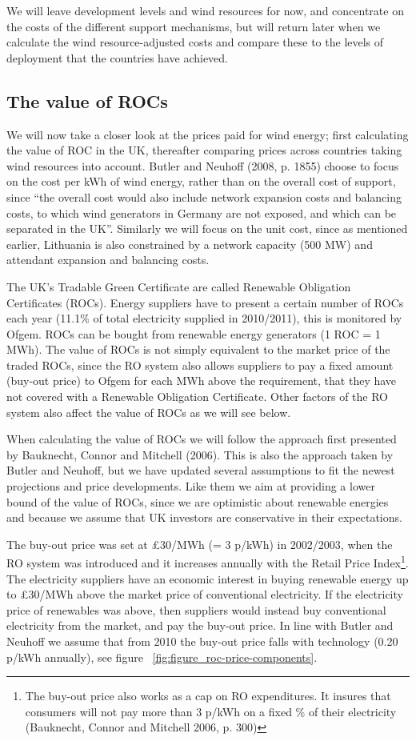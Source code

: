 \documentclass[a4paper, 12pt]{article}
\begin{document}
We will leave development levels and wind resources for now, and concentrate on the costs of the different support mechanisms, but will return later when we calculate the wind resource-adjusted costs and compare these to the levels of deployment that the countries have achieved.

\subsection{The value of ROCs}

We will now take a closer look at the prices paid for wind energy; first calculating the value of ROC in the UK, thereafter comparing prices across countries taking wind resources into account. Butler and Neuhoff (2008, p. 1855) choose to focus on the cost per kWh of wind energy, rather than on the overall cost of support, since ``the overall cost would also include network expansion costs and balancing costs, to which wind generators in Germany are not exposed, and which can be separated in the UK''. Similarly we will focus on the unit cost, since as mentioned earlier, Lithuania is also constrained by a network capacity (500 MW) and attendant expansion and balancing costs.

The UK's Tradable Green Certificate are called Renewable Obligation Certificates (ROCs). Energy suppliers have to present a certain number of ROCs each year (11.1\% of total electricity supplied in 2010/2011), this is monitored by Ofgem. ROCs can be bought from renewable energy generators (1 ROC = 1 MWh). The value of ROCs is not simply equivalent to the market price of the traded ROCs, since the RO system also allows suppliers to pay a fixed amount (buy-out price) to Ofgem for each MWh above the requirement, that they have not covered with a Renewable Obligation Certificate. Other factors of the RO system also affect the value of ROCs as we will see below.

When calculating the value of ROCs we will follow the approach first presented by Bauknecht, Connor and Mitchell (2006). This is also the approach taken by Butler and Neuhoff, but we have updated several assumptions to fit the newest projections and price developments. Like them we aim at providing a lower bound of the value of ROCs, since we are optimistic about renewable energies and because we assume that UK investors are conservative in their expectations.

The buy-out price was set at £30/MWh (= 3 p/kWh) in 2002/2003, when the RO system was introduced and it increases annually with the Retail Price Index\footnote{The buy-out price also works as a cap on RO expenditures. It insures that consumers will not pay more than 3 p/kWh on a fixed \% of their electricity (Bauknecht, Connor and Mitchell 2006, p. 300)}. The electricity suppliers have an economic interest in buying renewable energy up to £30/MWh above the market price of conventional electricity. If the electricity price of renewables was above, then suppliers would instead buy conventional electricity from the market, and pay the buy-out price. In line with Butler and Neuhoff we assume that from 2010 the buy-out price falls with technology (0.20 p/kWh annually), see figure ~\ref{fig:figure_roc-price-components}.
\end{document}
